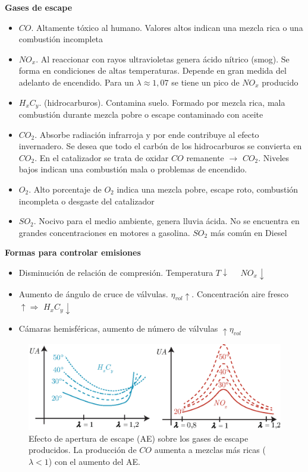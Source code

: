 {\bf Gases de escape}

\begin{itemize}
    \item $CO$. Altamente tóxico al humano. Valores altos indican una mezcla rica o una combustión incompleta
    \item $NO_x$. Al reaccionar con rayos ultravioletas genera ácido nítrico (smog). Se forma en condiciones de altas temperaturas. Depende en gran medida del adelanto de encendido. Para un $\lambda\approx 1,07$ se tiene un pico de $NO_x$ producido
    \item $H_xC_y$. (hidrocarburos). Contamina suelo. Formado por mezcla rica, mala combustión durante mezcla pobre o escape contaminado con aceite
    \item $CO_2$. Absorbe radiación infrarroja y por ende contribuye al efecto invernadero. Se desea que todo el carbón de los hidrocarburos se convierta en $CO_2$. En el catalizador se trata de oxidar $CO$ remanente $\rightarrow$ $CO_2$. Niveles bajos indican una combustión mala o problemas de encendido.
    \item $O_2$. Alto porcentaje de $O_2$ indica una mezcla pobre, escape roto, combustión incompleta o desgaste del catalizador
    \item $SO_2$. Nocivo para el medio ambiente, genera lluvia ácida. No se encuentra en grandes concentraciones en motores a gasolina. $SO_2$ más común en Diesel
\end{itemize}

{\bf Formas para controlar emisiones}

\begin{itemize}
    \item Disminución de relación de compresión. Temperatura $T\downarrow \quad$ $NO_x\downarrow$ 
    \item Aumento de ángulo de cruce de válvulas. $\eta_{vol}\uparrow$. Concentración aire fresco $\uparrow \Rightarrow $ $H_xC_y \downarrow$
    \item Cámaras hemisféricas, aumento de número de válvulas $\uparrow \eta_{vol}$
\end{itemize}

\begin{figure}[!htb]
    \centering
    \includegraphics[width=.47\textwidth]{fig/aperturaEscapeGases.eps}
    \caption{Efecto de apertura de escape (AE) sobre los gases de escape producidos. La producción de $CO$ aumenta a mezclas más ricas ($\lambda<1$) con el aumento del AE.}
    \label{fig:aperturaEscape}
\end{figure}
